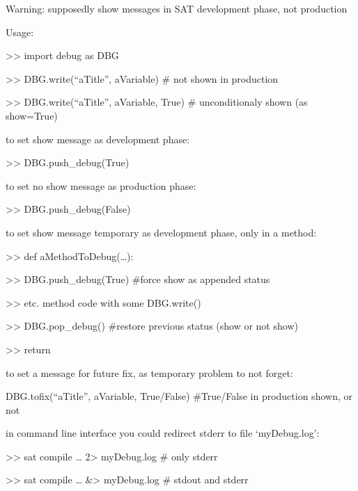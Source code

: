 \documentclass[a4paper,10pt,english]{sphinxmanual}
\begin{document}
\begin{DUlineblock}{0em}
\item[] Warning: supposedly show messages in SAT development phase, not production
\item[] 
\item[] Usage:
\item[] \textgreater{}\textgreater{} import debug as DBG
\item[] \textgreater{}\textgreater{} DBG.write(“aTitle”, aVariable)        \# not shown in production 
\item[] \textgreater{}\textgreater{} DBG.write(“aTitle”, aVariable, True)  \# unconditionaly shown (as show=True)
\item[] 
\item[] to set show message as development phase:
\item[] \textgreater{}\textgreater{} DBG.push\_debug(True)
\item[] 
\item[] to set no show message as production phase:
\item[] \textgreater{}\textgreater{} DBG.push\_debug(False)
\item[] 
\item[] to set show message temporary as development phase, only in a method:
\item[] \textgreater{}\textgreater{} def aMethodToDebug(…):
\item[] \textgreater{}\textgreater{}   DBG.push\_debug(True)              \#force show as appended status
\item[] \textgreater{}\textgreater{}   etc. method code with some DBG.write()
\item[] \textgreater{}\textgreater{}   DBG.pop\_debug()                   \#restore previous status (show or not show)
\item[] \textgreater{}\textgreater{}   return
\item[] 
\item[] to set a message for future fix, as temporary problem to not forget:
\item[] DBG.tofix(“aTitle”, aVariable, True/False) \#True/False in production shown, or not
\item[] 
\item[] in command line interface you could redirect stderr to file ‘myDebug.log’:
\item[] \textgreater{}\textgreater{} sat compile … 2\textgreater{} myDebug.log   \# only stderr
\item[] \textgreater{}\textgreater{} sat compile … \&\textgreater{} myDebug.log   \# stdout and stderr
\end{DUlineblock}
\end{document}
